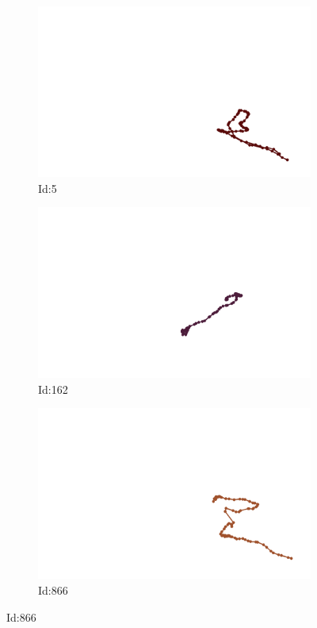 \documentclass[12pt,twoside]{report}
\begin{document}
\begin{figure}
\centering
\begin{subfigure}[b]{0.20\textwidth}
\centering
\includegraphics[width=\textwidth]{../../trajectories/5.png}
\caption{Id:5}
\end{subfigure}
\begin{subfigure}[b]{0.20\textwidth}
\centering
\includegraphics[width=\textwidth]{../../trajectories/162.png}
\caption{Id:162}
\end{subfigure}
\begin{subfigure}[b]{0.20\textwidth}
\centering
\includegraphics[width=\textwidth]{../../trajectories/866.png}
\caption{Id:866}
\end{subfigure}
\end{figure}
\end{document}
